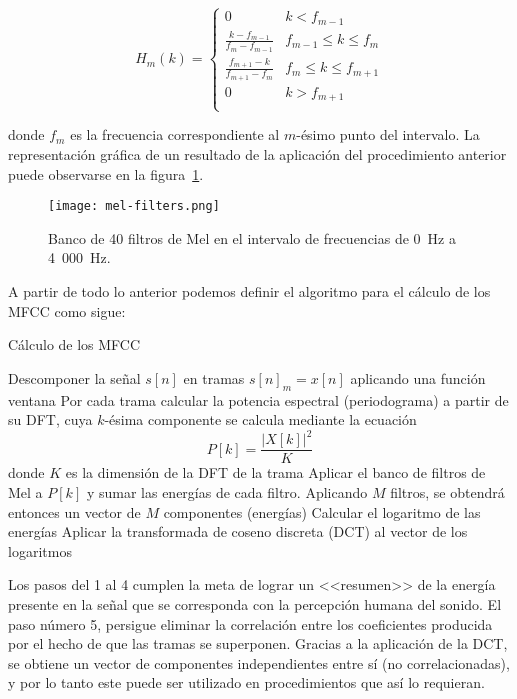 \begin{equation}
    \label{eq:Mel filterbank}
    H_m(k) = \begin{cases}
                 0 & k < f_{m-1} \\
                 \frac{k-f_{m-1}}{f_m - f_{m-1}} & f_{m-1}\leq k\leq f_m \\
                 \frac{f_{m+1}-k}{f_{m+1}-f_m} & f_m \leq k\leq f_{m+1} \\
                 0 & k > f_{m+1} \\
    \end{cases}
\end{equation}

\noindent
donde $f_m$ es la frecuencia correspondiente al $m$-ésimo punto del intervalo.
La representación gráfica de un resultado de la aplicación del procedimiento anterior puede observarse en la figura~\ref{img:mel-filters}.

\begin{figure}[!h]
    \centering
    \texttt{[image: mel-filters.png]}
    \caption{Banco de 40 filtros de Mel en el intervalo de frecuencias de 0~Hz a 4~000~Hz.}
    \label{img:mel-filters}
\end{figure}

A partir de todo lo anterior podemos definir el algoritmo para el cálculo de los MFCC como sigue:

\begin{algorithm}
    \caption{Cálculo de los MFCC}
    \label{algorithm:MFCC}
    Descomponer la señal $s[n]$ en tramas $s[n]_m = x[n]$ aplicando una función ventana\;
    Por cada trama calcular la potencia espectral (periodograma) a partir de su DFT, cuya $k$-ésima componente se calcula mediante la ecuación
    \[
        P[k] = \frac{|X[k]|^2}{K}
    \]
    donde $K$ es la dimensión de la DFT de la trama\;
    Aplicar el banco de filtros de Mel a $P[k]$ y sumar las energías de cada filtro.
    Aplicando $M$ filtros, se obtendrá entonces un vector de $M$ componentes (energías)\;
    Calcular el logaritmo de las energías\;
    Aplicar la transformada de coseno discreta (DCT) al vector de los logaritmos\;
\end{algorithm}

Los pasos del 1 al 4 cumplen la meta de lograr un <<resumen>> de la energía presente en la señal que se corresponda con la percepción humana del sonido.
El paso número 5, persigue eliminar la correlación entre los coeficientes producida por el hecho de que las tramas se superponen.
Gracias a la aplicación de la DCT, se obtiene un vector de componentes independientes entre sí (no correlacionadas), y por lo tanto este puede ser utilizado en procedimientos que así lo requieran.

